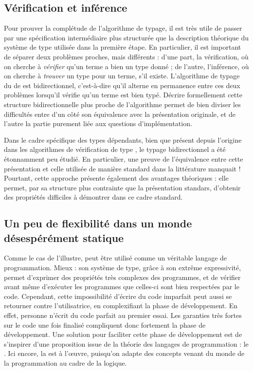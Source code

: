 \subsection{Vérification et inférence}

Pour prouver la complétude de l’algorithme de typage, il est très utile de
passer par une spécification intermédiaire plus structurée que la description
théorique du système de type utilisée dans la première étape.
En particulier, il est important de séparer deux problèmes proches, mais
différents :
d'une part, la vérification, où on cherche à \emph{vérifier}
qu’un terme a bien un type
donné ; de l’autre, l’inférence, où on cherche à \emph{trouver}
un type pour un terme, s'il existe.
L’algorithme de typage du  de  est bidirectionnel,
c'est-à-dire qu’il alterne en permanence entre ces deux problèmes
lorsqu’il vérifie qu’un terme est bien typé.
Décrire formellement cette structure bidirectionnelle plus proche de l’algorithme
permet de bien diviser les difficultés entre d’un côté
son équivalence avec la présentation
originale, et de l’autre la partie purement liée aux questions d’implémentation.

Dans le cadre spécifique des types dépendants, bien que présent depuis l’origine dans les algorithmes de vérification de type ,
le typage bidirectionnel a été étonnamment peu étudié. En particulier, une preuve
de l’équivalence entre cette présentation et celle utilisée de manière standard
dans la littérature manquait !
Pourtant, cette approche présente également
des avantages théoriques : elle permet,
par sa structure plus contrainte que la présentation standars,
d’obtenir des propriétés difficiles à démontrer dans ce cadre standard.

\subsection{Un peu de flexibilité dans un monde désespérément statique}
\label{sec:intro-graduel}

Comme le cas de  l’illustre,  peut être utilisé comme un véritable langage
de programmation. Mieux : son système de type, grâce à son extrême expressivité, 
permet d’exprimer des propriétés très complexes des programmes, et de vérifier
avant même d’exécuter les programmes que celles-ci sont bien respectées par le code.
Cependant, cette impossibilité d’écrire du code imparfait peut aussi se retourner contre l’utilisatrice, en complexifiant la phase de développement.
En effet, personne n’écrit du code parfait au premier essai. Les garanties très
fortes sur le code une fois finalisé compliquent donc 
fortement la phase de développement.
Une solution pour faciliter cette phase de développement
est de s’inspirer d’une proposition issue de la théorie des langages de
programmation : le . Ici encore, la 
est à l’œuvre, puisqu’on adapte des concepts venant du monde de la programmation
au cadre de la logique.


